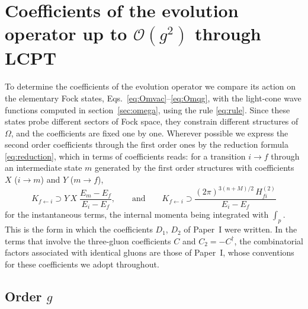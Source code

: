 \documentclass[11pt,a4paper]{article}
\numberwithin{equation}{section}
\newcommand{\dg}{\dagger}
\newcommand{\OM}{\Omega}
\newcommand{\order}[1]{\mathcal{O}(#1)}
\begin{document}
\section{Coefficients of the evolution operator up to $\order{g^{2}}$ through LCPT}
\label{sec:coeff}

To determine the coefficients of the evolution operator we compare its action on the elementary
Fock states, Eqs.~\eqref{eq:Omvac}--\eqref{eq:Omqg}, with the light-cone wave functions computed in
section~\ref{sec:omega}, using the rule \eqref{eq:rule}. Since these states probe different
sectors of Fock space, they constrain different structures of $\OM$, and the coefficients are fixed
one by one. Wherever possible we express the second order coefficients through the first order
ones by the reduction formula \eqref{eq:reduction}, which in terms of coefficients reads: for a
transition $i\to f$ through an intermediate state $m$ generated by the first order structures with
coefficients $X$ ($i\to m$) and $Y$ ($m\to f$),
\begin{equation}
K_{f\leftarrow i}\supset Y\,X\;\frac{E_{m}-E_{f}}{E_{i}-E_{f}},
\qquad\text{and}\qquad
K_{f\leftarrow i}\supset\frac{(2\pi)^{3(n+M)/2}\,H^{(2)}_{fi}}{E_{i}-E_{f}}
\label{eq:redcoef}
\end{equation}
for the instantaneous terms, the internal momenta being integrated with $\int_{p}$. This is the
form in which the coefficients $D_{1}$, $D_{2}$ of Paper~I were written. In the terms that involve the
three-gluon coefficients $C$ and $C_{2}=-C^{\dg}$, the combinatorial factors associated with identical
gluons are those of Paper~I, whose conventions for these coefficients we adopt throughout.

\subsection{Order $g$}
\end{document}
